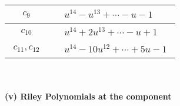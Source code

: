 \documentclass[1p]{elsarticle_modified}
\theoremstyle{definition}
\begin{document}
\begin{tabular}{m{50pt}|m{274pt}}
\hline $$\begin{aligned}c_{9}\end{aligned}$$&$\begin{aligned}
&u^{14}- u^{13}+\cdots- u-1
\end{aligned}$\\
\hline $$\begin{aligned}c_{10}\end{aligned}$$&$\begin{aligned}
&u^{14}+2 u^{13}+\cdots- u+1
\end{aligned}$\\
\hline $$\begin{aligned}c_{11},c_{12}\end{aligned}$$&$\begin{aligned}
&u^{14}-10 u^{12}+\cdots+5 u-1
\end{aligned}$\\
\hline
\end{tabular}\\~\\
\newpage\renewcommand{\arraystretch}{1}
\flushleft \textbf{(v) Riley Polynomials at the component}\newline \\
\end{document}
